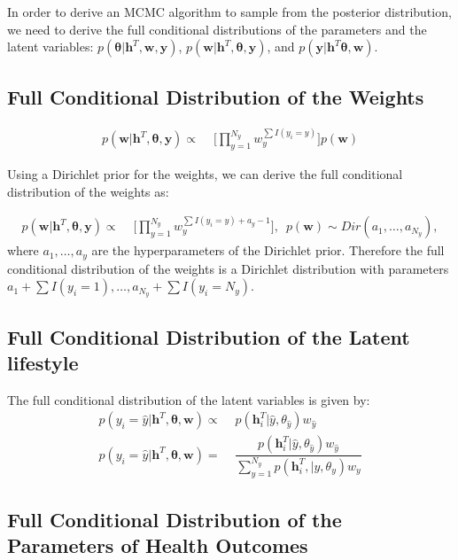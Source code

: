\documentclass{article}
\begin{document}
In order to derive an MCMC algorithm to sample from the posterior distribution, we need to derive the full conditional distributions of the parameters and the latent variables: $p(\bm{\theta}|\bm{h}^T,\bm{w},\bm{y})$, $p(\bm{w}|\bm{h}^T,\bm{\theta},\bm{y})$, and $p(\bm{y}|\bm{h}^T\bm{\theta},\bm{w})$.

\subsection{Full Conditional Distribution of the Weights}

\begin{align}
    p(\bm{w}|\bm{h}^T,\bm{\theta},\bm{y})\propto\,\,& \Big[\prod_{y=1}^{N_y} w_y^{\sum I(y_i=y)}\Big]  p(\bm{w})
\end{align}

Using a Dirichlet prior for the weights, we can derive the full conditional distribution of the weights as:

\begin{align}
    p(\bm{w}|\bm{h}^T,\bm{\theta},\bm{y})\propto\,\,& \Big[\prod_{y=1}^{N_y} w_y^{\sum I(y_i=y)+ a_{y}-1}\Big],\,\,\, p(\bm{w})\sim Dir(a_1,\ldots,a_{N_y}),
\end{align}
where $a_1,\dots,a_y$ are the hyperparameters of the Dirichlet prior. Therefore the full conditional distribution of the weights is a Dirichlet distribution with parameters $a_1+\sum I(y_i=1),\ldots,a_{N_y}+\sum I(y_i=N_y)$.

\subsection{Full Conditional Distribution of the Latent lifestyle}

The full conditional distribution of the latent variables is given by:
\begin{align}
    p(y_i=\hat{y}|\bm{h}^T,\bm{\theta},\bm{w})\propto\,\,& p(\bm{h}_i^T|\hat{y},\theta_{\hat{y}}) w_{\hat{y}}\\
    p(y_i=\hat{y}|\bm{h}^T,\bm{\theta},\bm{w})=\,\,& \dfrac{p(\bm{h}_i^T|\hat{y},\theta_{\hat{y}}) w_{\hat{y}}}{\sum_{y=1}^{N_y} p(\bm{h}_i^T,|y,\theta_{y}) w_{y}}
\end{align}
\subsection{Full Conditional Distribution of the Parameters of Health Outcomes}
\end{document}
